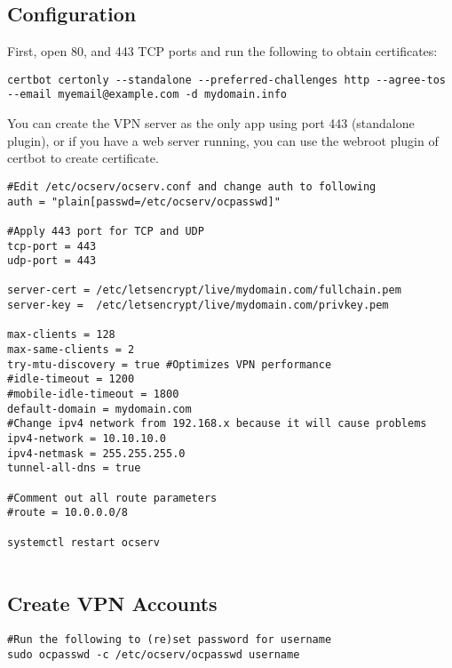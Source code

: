 \documentclass{article}
\begin{document}
\subsection{Configuration}
First, open 80, and 443 TCP ports and run the following to obtain certificates:  
\begin{verbatim}
certbot certonly --standalone --preferred-challenges http --agree-tos --email myemail@example.com -d mydomain.info

\end{verbatim}

You can create the VPN server as the only app using port 443 (standalone plugin), or if you have a web server running, you can use the webroot plugin of certbot to create certificate. 


\begin{verbatim}
#Edit /etc/ocserv/ocserv.conf and change auth to following
auth = "plain[passwd=/etc/ocserv/ocpasswd]"

#Apply 443 port for TCP and UDP
tcp-port = 443
udp-port = 443

server-cert = /etc/letsencrypt/live/mydomain.com/fullchain.pem
server-key =  /etc/letsencrypt/live/mydomain.com/privkey.pem

max-clients = 128
max-same-clients = 2
try-mtu-discovery = true #Optimizes VPN performance
#idle-timeout = 1200
#mobile-idle-timeout = 1800
default-domain = mydomain.com
#Change ipv4 network from 192.168.x because it will cause problems 
ipv4-network = 10.10.10.0
ipv4-netmask = 255.255.255.0
tunnel-all-dns = true

#Comment out all route parameters 
#route = 10.0.0.0/8

systemctl restart ocserv


\end{verbatim}

\subsection{Create VPN Accounts}
\begin{verbatim}
#Run the following to (re)set password for username
sudo ocpasswd -c /etc/ocserv/ocpasswd username 
\end{verbatim}
\end{document}
